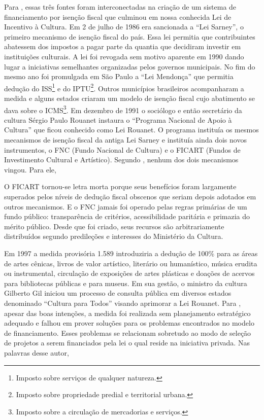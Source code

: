 \documentclass[a4paper, 12pt, openright, oneside, german, french, english, brazil]{abntex2}
\begin{document}
	Para , essas três fontes foram interconectadas na criação de um sistema de financiamento por isenção fiscal que culminou em nossa conhecida Lei de Incentivo à Cultura. Em 2 de julho de 1986 era sancionada a ``Lei Sarney'', o primeiro mecanismo de isenção fiscal do país. Essa lei permitia que contribuintes abatessem dos impostos a pagar parte da quantia que decidiram investir em instituições culturais. A lei foi revogada sem motivo aparente em 1990 dando lugar a iniciativas semelhantes organizadas pelos governos municipais. No fim do mesmo ano foi promulgada em São Paulo a ``Lei Mendonça'' que permitia dedução do ISS\footnote{Imposto sobre serviços de qualquer natureza.} e do IPTU\footnote{Imposto sobre propriedade predial e territorial urbana.}. Outros municípios brasileiros acompanharam a medida e alguns estados criaram um modelo de isenção fiscal cujo abatimento se dava sobre o ICMS\footnote{Imposto sobre a circulação de mercadorias e serviços.}. Em dezembro de 1991 o sociólogo e então secretário da cultura Sérgio Paulo Rouanet instaura o ``Programa Nacional de Apoio à Cultura'' que ficou conhecido como Lei Rouanet. O programa instituía os mesmos mecanismos de isenção fiscal da antiga Lei Sarney e instituía ainda dois novos instrumentos, o FNC (Fundo Nacional de Cultura) e o FICART (Fundos de Investimento Cultural e Artístico). Segundo , nenhum dos dois mecanismos vingou. Para ele,

	\begin{citacao}
		O FICART tornou-se letra morta porque seus benefícios foram largamente superados pelos níveis de dedução fiscal obscenos que seriam depois adotados em outros mecanismos. E o FNC jamais foi operado pelas regras primárias de um fundo público: transparência de critérios, acessibilidade paritária e primazia do mérito público. Desde que foi criado, seus recursos são arbitrariamente distribuídos segundo predileções e interesses do Ministério da Cultura. \cite[p. 22-3]{sarkovas2005incentivo}
	\end{citacao}

	Em 1997 a medida provisória 1.589 introduziria a dedução de 100\% para as áreas de artes cênicas, livros de valor artístico, literário ou humanístico, música erudita ou instrumental, circulação de exposições de artes plásticas e doações de acervos para bibliotecas públicas e para museus. Em sua gestão, o ministro da cultura Gilberto Gil iniciou um processo de consulta pública em diversos estados denominado ``Cultura para Todos'' visando aprimorar a Lei Rouanet. Para , apesar das boas intenções, a medida foi realizada sem planejamento estratégico adequado e falhou em prover soluções para os problemas encontrados no modelo de financiamento. Esses problemas se relacionam sobretudo ao modo de seleção de projetos a serem financiados pela lei o qual reside na iniciativa privada. Nas palavras desse autor,
\end{document}
